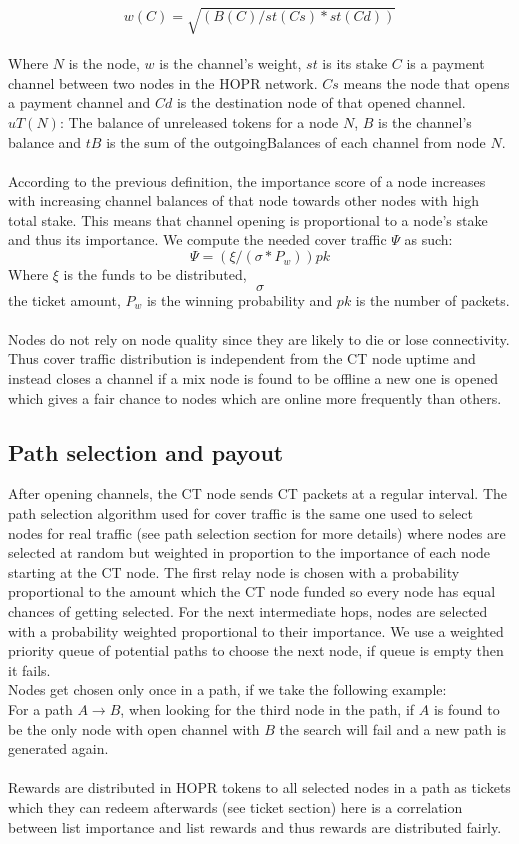 $$w(C) = \sqrt{(B(C) / st(Cs) * st(Cd))}$$
\\
Where $N$ is the node, $w$ is the channel's weight, $st$ is its stake $C$ is a payment channel between two nodes in the HOPR network. $Cs$ means the node that opens a payment channel and 
$Cd$ is the destination node of that opened channel. $uT(N)$: The balance of unreleased tokens for a node $N$, $B$ is the channel's balance and $tB$ is the sum of the outgoingBalances of each channel from node $N$.
\\~\\ According to the previous definition, the importance score of a node increases with increasing channel balances of that node towards other nodes with high total stake. This means that channel opening is proportional to a node’s stake and thus its importance. We compute the needed cover traffic $\Psi$ as such:
$$\Psi= ( \xi/ (\sigma * P_w)) pk$$
Where $\xi$ is the funds to be distributed, $$\sigma$$ the ticket amount, $P_w$ is the winning probability and $pk$ is the number of packets.
\\~\\Nodes do not rely on node quality since they are likely to die or lose connectivity. Thus cover traffic distribution is independent from the CT node uptime and instead closes a channel if a mix node is found to be offline a new one is opened which gives a fair chance to nodes which are online more frequently than others. 

\subsection{Path selection and payout}
After opening channels, the CT node sends CT packets at a regular interval. The path selection algorithm used for cover traffic is the same one used to select nodes for real traffic (see path selection section for more details) where nodes are selected at random  but weighted in proportion to the importance of each node starting at the CT node.
The first relay node is chosen with a probability proportional to the amount which the CT node funded so every node has equal chances of getting selected. For the next intermediate hops, nodes are selected with a probability weighted proportional to their importance. We use a weighted priority queue of potential paths to choose the next node, if queue is empty then it fails.
\\Nodes get chosen only once in a path, if we take the following example:
\\For a path $A\rightarrow B$, when looking for the third node in the path, if $A$ is found to be the only node with open channel with $B$ the search will fail and a new path is generated again.
\\~\\ Rewards are distributed in HOPR tokens to all selected nodes in a path as tickets which they can redeem afterwards (see ticket section) here is a correlation between list importance and list 
rewards and thus rewards are distributed fairly.


